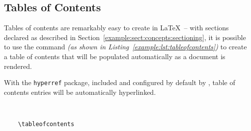 \subsection{Tables of Contents}
Tables of contents are remarkably easy to create in \LaTeX\ -- with sections declared as described in Section~\ref{example:sect:concepts:sectioning}, it is possible to use the  command \textit{(as shown in Listing~\ref{example:lst:tableofcontents})} to create a table of contents that will be populated automatically as a document is rendered.

With the \texttt{hyperref} package, included and configured by default by \uswdwmspkg{}, table of contents entries will be automatically hyperlinked.

\begin{listing}[H]
  \captionsetup{skip=\skiplistingcaptionlen}
  \begin{verbatim}
    
    
    \tableofcontents
  \end{verbatim}
  \caption{\texttt{\textbackslash tableofcontents} command example}
  \label{example:lst:tableofcontents}
\end{listing}
